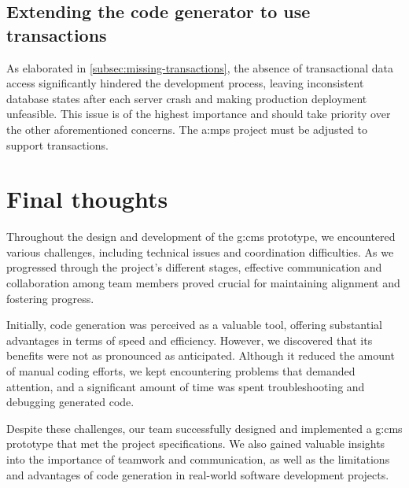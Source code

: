 \subsection{Extending the code generator to use transactions}

As elaborated in \cref{subsec:missing-transactions}, the absence of transactional data access significantly hindered the development process, leaving inconsistent database states after each server crash and making production deployment unfeasible. This issue is of the highest importance and should take priority over the other aforementioned concerns. The \gls{a:mps} project must be adjusted to support transactions.

\section{Final thoughts}

Throughout the design and development of the \gls{g:cms} prototype, we encountered various challenges, including technical issues and coordination difficulties. As we progressed through the project's different stages, effective communication and collaboration among team members proved crucial for maintaining alignment and fostering progress.

Initially, code generation was perceived as a valuable tool, offering substantial advantages in terms of speed and efficiency. However, we discovered that its benefits were not as pronounced as anticipated. Although it reduced the amount of manual coding efforts, we kept encountering problems that demanded attention, and a significant amount of time was spent troubleshooting and debugging generated code.

Despite these challenges, our team successfully designed and implemented a \gls{g:cms} prototype that met the project specifications. We also gained valuable insights into the importance of teamwork and communication, as well as the limitations and advantages of code generation in real-world software development projects.